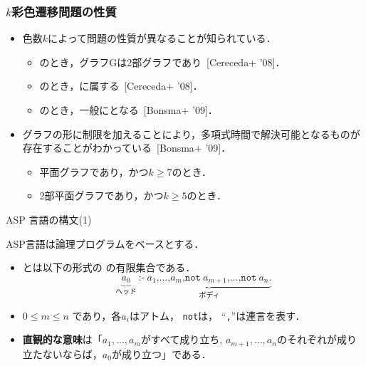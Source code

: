 \begin{frame}\frametitle{$k$彩色遷移問題の性質}

  \begin{itemize}
    \item 色数$k$によって問題の性質が異なることが知られている．
    \begin{itemize}
      \item {}のとき，グラフGは2部グラフであり~[Cereceda+ '08]．
      \item {}のとき，に属する~[Cereceda+ '08]．
      \item {}のとき，一般にとなる~[Bonsma+ '09]．
    \end{itemize}

    \item グラフの形に制限を加えることにより，多項式時間で解決可能となるものが存在することがわかっている~[Bonsma+ '09]．
    \begin{itemize}
      \item 平面グラフであり，かつ$k \ge 7$のとき．
      \item 2部平面グラフであり，かつ$k \ge 5$のとき．
    \end{itemize}

  \end{itemize}
\end{frame}
\begin{frame}{ASP 言語の構文(1)}
  \begin{alertblock}{}\centering
    ASP言語は論理プログラムをベースとする\footnotemark[1]．
  \end{alertblock}
\begin{itemize}
\item {}とは以下の形式の
  の有限集合である．
  \[
    \underbrace{a_0}_{\textrm{ヘッド}}\ \texttt{:-}\
    \underbrace{a_1\texttt{,}\dots\texttt{,}a_m\texttt{,}
      \texttt{not}\ {a_{m+1}}\texttt{,}\dots\texttt{,}
      \texttt{not}\ {a_n}\texttt{.}}_{\textrm{ボディ}}
  \]
\item $0\leq m\leq n$ であり，各$a_i$はアトム，
  \texttt{not}は，
  ``\texttt{,}''は連言を表す．
\item \alert{\bf 直観的な意味}は「$a_1,\ldots,a_m$がすべて成り立ち,
  $a_{m+1},\ldots,a_n$のそれぞれが成り立たないならば，$a_0$が成り立つ」である．
\end{itemize}
\end{frame}
